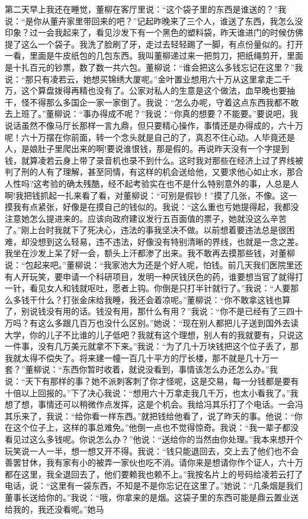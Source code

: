 \documentclass[12pt,oneside]{book}
\begin{document}
第二天早上我还在睡觉，董柳在客厅里说：``这个袋子里的东西是谁送的？''我说：``是你从董卉家里带回来的吧？''记起昨晚来了三个人，谁送了东西，我怎么没印象？过一会我起来了，看见沙发下有一个黑色的塑料袋，昨天谁进门的时候仿佛提了这么一个袋子。我洗了脸刷了牙，走过去轻轻踢了一脚，有点份量似的。打开一看，里面是牛皮纸包的几包东西。我叫董柳递过来一把剪刀，把纸绳剪开，里面是十扎百元的钞票，数了数一共六包。董柳说：``谁会把这么多钱忘记在这里？''我说：``那只有凌若云，她想买锦绣大厦呢。''金叶置业想用六十万从这里拿走二千万，这个算盘拨得再精也没有了。公家对私人的生意是这个做法，血早晚也要抽干，怪不得那么多国企一家一家倒了。我说：``怎么办呢，守着这点东西我都不敢去上班了。''董柳说：``事办得成不呢？''我说：``你真的想要？不能要。''要说吧，我说话虽然不像马厅长那样一言九鼎，但只要精心操作，事情还是办得成的，六十万呢！六十万摆在你前面，转一个念头就是自己的了，真忍不住心动。人毕竟还是人，是娘肚子里爬出来的啊!要说谁恨钱，那是假的。再说昨天没有一个字提到钱，就算凌若云身上带了录音机也录不到什么。这时我对那些在经济上过了界线被判了刑的人有了理解，甚至同情，有这样的机会送给他，又要求他心如止水，那合人性吗?这考验的确太残酷，经不起考验实在也不是什么特别意外的事，人总是人啊!我把钱抓起一扎来看了看，对董柳说：``可别是假钞！''摸了几张，不像。这一摸我有点紧张，好像是在摸自己的钱似的。我说：``这么重也亏她提得起，我都没注意她怎么提进来的。应该向政府建议发行五百面值的票子，她就没这么辛苦了。''刚上台时我就下了死决心，违法的事我坚决不做。以前想着要违法总是很困难，却没想到这么轻易，违不违法，好像没有特别清晰的界线，也就是一念之差。我坐在沙发上呆了好一会，额头上汗都渗了出来。我不敢再去摸那些钱，对董柳说：``包起来吧。''董柳说：``我家池大为还是个好人呢，怕钱。前几天我们医院里还有人开玩笑，要申请一个科研项目，发明一种厌钱厌色的药，谁要想当官了就得打一针，看见女人和钱就呕吐，愿者上钩。你倒是只打半针就行了。''我说：``人要那么多钱干什么？打张金床给我睡，我还会着凉呢。''董柳说：``你不敢拿这钱也算了，别说钱没有用的话。钱没有用，那什么有用？''我说：``你不是已经有了三四十万吗？有这么多跟几百万也没什么区别。''她说：``现在别人都把儿子送到国外去读大学，你的儿子不比谁的儿子低吧？我就有这个理想，别人有的我就要有，只说这一件事，没有几万美元就拿不下来。''我说：``为了几十万块钱把这个位子丢了，那我就太得不偿失了。将来建一幢一百几十平方的厅长楼，那不就是几十万一套？''董柳说：``东西你暂时收着，就说没看到，事情该怎么办还怎么办。''我说：``天下有那样的事？她不派刺客刺了你才怪呢，这是交易，每一分钱都是要有十倍以上回报的。''下了决心我说：``想用六十万拿走我几千万，也太小看我了。''我想了想，事情还可以稍微作点发挥，这是个机会。我给冯其乐打了个电话。一会冯其乐来了，我说：``给你看一样东西。''就把钱给他看了，说了昨天的事。他说：``你在这个位子上，这样的事总难免。''他倒一点也不觉得惊奇。我说：``我一辈子都没看见过这么多钱呢。你说怎么办？''他说：``送给你的当然由你处理。''我本来想开个玩笑说一人一半，想一想又开不得。我说：``钱只能退回去，交上去了他们也不会善罢甘休，我有家有小的被弄一家伙也吃不消。请你来是想请你作个证人，六十万都在这里，我全退回去了，他们要赖我也赖不上。''我按名片上的号码给凌若云打了电话，说：``这里有一袋东西，不知是不是你忘记在这里了。''她说：``几条烟是我们董事长送给你的。''我说：``哦，你拿来的是烟。这袋子里的东西可能是鼎云置业送给我的，我还没看呢。''她马
\end{document}
